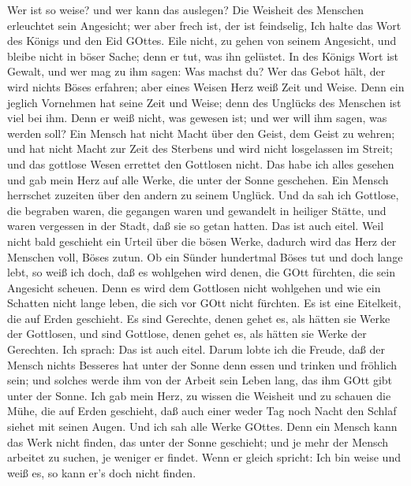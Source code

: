  Wer ist so weise? und wer kann das auslegen? Die Weisheit
des Menschen erleuchtet sein Angesicht; wer aber frech ist, der ist
feindselig,  Ich halte das Wort des Königs und den Eid
GOttes.  Eile nicht, zu gehen von seinem Angesicht, und
bleibe nicht in böser Sache; denn er tut, was ihn gelüstet. 
In des Königs Wort ist Gewalt, und wer mag zu ihm sagen: Was machst du?
 Wer das Gebot hält, der wird nichts Böses erfahren; aber
eines Weisen Herz weiß Zeit und Weise.  Denn ein jeglich
Vornehmen hat seine Zeit und Weise; denn des Unglücks des Menschen ist
viel bei ihm.  Denn er weiß nicht, was gewesen ist; und wer
will ihm sagen, was werden soll?  Ein Mensch hat nicht Macht
über den Geist, dem Geist zu wehren; und hat nicht Macht zur Zeit des
Sterbens und wird nicht losgelassen im Streit; und das gottlose Wesen
errettet den Gottlosen nicht.  Das habe ich alles gesehen
und gab mein Herz auf alle Werke, die unter der Sonne geschehen. Ein
Mensch herrschet zuzeiten über den andern zu seinem Unglück.
 Und da sah ich Gottlose, die begraben waren, die gegangen
waren und gewandelt in heiliger Stätte, und waren vergessen in der
Stadt, daß sie so getan hatten. Das ist auch eitel.  Weil
nicht bald geschieht ein Urteil über die bösen Werke, dadurch wird das
Herz der Menschen voll, Böses zutun.  Ob ein Sünder
hundertmal Böses tut und doch lange lebt, so weiß ich doch, daß es
wohlgehen wird denen, die GOtt fürchten, die sein Angesicht scheuen.
 Denn es wird dem Gottlosen nicht wohlgehen und wie ein
Schatten nicht lange leben, die sich vor GOtt nicht fürchten.
 Es ist eine Eitelkeit, die auf Erden geschieht. Es sind
Gerechte, denen gehet es, als hätten sie Werke der Gottlosen, und sind
Gottlose, denen gehet es, als hätten sie Werke der Gerechten. Ich
sprach: Das ist auch eitel.  Darum lobte ich die Freude,
daß der Mensch nichts Besseres hat unter der Sonne denn essen und
trinken und fröhlich sein; und solches werde ihm von der Arbeit sein
Leben lang, das ihm GOtt gibt unter der Sonne.  Ich gab
mein Herz, zu wissen die Weisheit und zu schauen die Mühe, die auf Erden
geschieht, daß auch einer weder Tag noch Nacht den Schlaf siehet mit
seinen Augen.  Und ich sah alle Werke GOttes. Denn ein
Mensch kann das Werk nicht finden, das unter der Sonne geschieht; und je
mehr der Mensch arbeitet zu suchen, je weniger er findet. Wenn er gleich
spricht: Ich bin weise und weiß es, so kann er's doch nicht finden.

